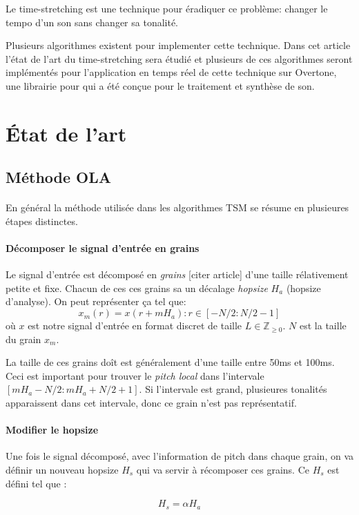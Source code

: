 \documentclass[letterpaper]{article}
\begin{document}
  Le time-stretching est une technique pour éradiquer ce problème: changer le tempo d'un
  son sans changer sa tonalité.

  Plusieurs algorithmes existent pour implementer cette technique. Dans cet article l'état de
  l'art du time-stretching sera étudié et plusieurs de ces algorithmes seront
  implémentés pour l'application en temps réel de cette technique sur Overtone, une librairie pour
  qui a été conçue pour le traitement et synthèse de son. 

\section{État de l'art}
\subsection{Méthode OLA}
\paragraph{}En général la méthode utilisée dans les algorithmes TSM se résume en plusieures étapes
distinctes.

\paragraph{Décomposer le signal d'entrée en grains} Le signal d'entrée est décomposé en
\emph{grains} [citer article] d'une taille rélativement petite et fixe. Chacun de ces ces grains sa un décalage \emph{hopsize} $H_{a}$ (hopsize d'analyse). On peut représenter ça tel que:
$$x_m(r) = x(r + mH_{a}) : r \in [-N/2 : N/2 -1]$$
où $x$ est notre signal d'entrée en format discret de taille $L \in \mathbb{Z}_{\geq0}$. $N$ est la
taille du grain $x_m$.

La taille de ces grains doît est généralement d'une taille entre 50ms et 100ms. Ceci est important
pour trouver le \emph{pitch local} dans l'intervale $[mH_{a} - N/2 : mH_{a} + N/2 +1]$. Si l'intervale
est grand, plusieures tonalités apparaissent dans cet intervale, donc ce grain n'est pas représentatif.
\paragraph{Modifier le hopsize} Une fois le signal décomposé, avec l'information de pitch dans chaque grain, on va définir un nouveau hopsize $H_{s}$ qui va servir à récomposer ces grains. Ce $H_{s}$ est défini tel que :

$$H_{s} = \alpha H_{a}$$
\end{document}
